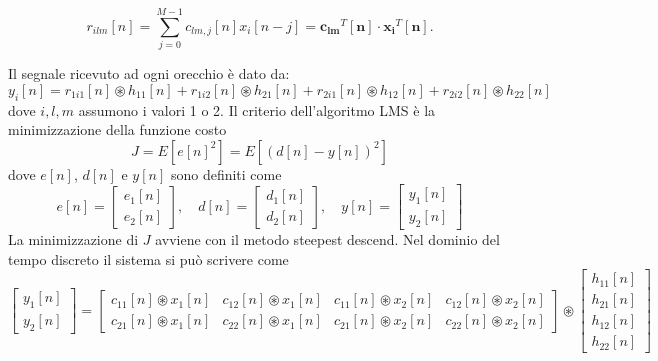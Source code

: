 \documentclass[12pt,a4paper,titlepage]{article}
\begin{document}
\begin{equation}\label{eq:r_ilm_prodotto_scalare}
r_{ilm}[n]=\sum_{j=0}^{M-1}c_{lm,j}[n]x_i[n-j] = \mathbf{c_{lm}}^T[\mathbf{n}] \cdot \mathbf{x_i}^T[\mathbf{n}].
\end{equation}

Il segnale ricevuto ad ogni orecchio è dato da:
\begin{equation}\label{eq:y_i_lms}
y_i[n]=r_{1i1}[n] \circledast h_{11}[n]+r_{1i2}[n] \circledast h_{21}[n]+
r_{2i1}[n] \circledast h_{12}[n]+r_{2i2}[n] \circledast h_{22}[n]
\end{equation}
dove $i,l,m$ assumono i valori 1 o 2.
Il criterio dell'algoritmo LMS è la minimizzazione della funzione costo
\begin{equation}
J=E[e[n]^2]=E[(d[n]-y[n])^2]
\end{equation}
dove $e[n]$, $d[n]$ e $y[n]$ sono definiti come
\begin{equation}
e[n]=
\begin{bmatrix}
e_1[n]\\
e_2[n]
\end{bmatrix},\quad
d[n]=
\begin{bmatrix}
d_1[n]\\
d_2[n]
\end{bmatrix},\quad
y[n]=
\begin{bmatrix}
y_1[n]\\
y_2[n]
\end{bmatrix}
\end{equation}
La minimizzazione di $J$ avviene con il metodo steepest descend.
Nel dominio del tempo discreto il sistema si può scrivere come
\begin{equation}\label{eq:y_lms}
\begin{bmatrix}
	y_1[n]     \\
	y_2[n]    
\end{bmatrix}
= 
\begin{bmatrix}
	c_{11}[n] \circledast x_1[n]  &  c_{12}[n] \circledast x_1[n]  & c_{11}[n] \circledast x_2[n]  & c_{12}[n] \circledast x_2[n]    \\
	c_{21}[n] \circledast x_1[n]  &  c_{22}[n] \circledast x_1[n]  & c_{21}[n] \circledast x_2[n]  & c_{22}[n] \circledast x_2[n]     
\end{bmatrix} 
\circledast
\begin{bmatrix}
	h_{11}[n] \\
	h_{21}[n] \\
	h_{12}[n] \\
	h_{22}[n]  
\end{bmatrix}
\end{equation}
\end{document}
